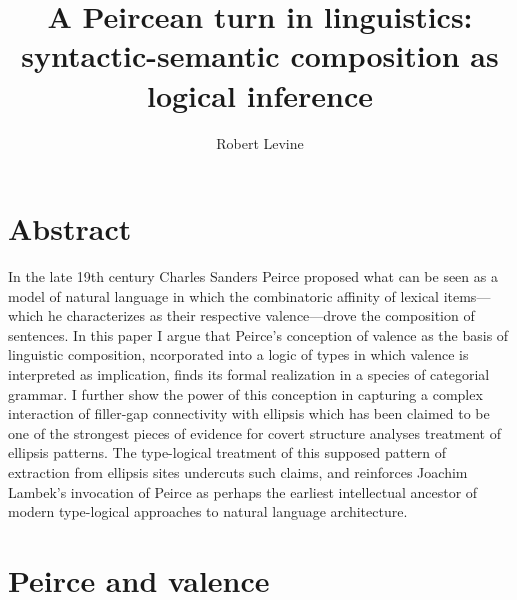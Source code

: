 \documentclass[output=paper,colorlinks,citecolor=brown]{langscibook}
\title{A Peircean turn in linguistics: syntactic-semantic composition as logical inference}
\author{Robert Levine\affiliation{Ohio State University}}
\begin{document}
\maketitle

\section{Abstract}
In the late 19th century Charles Sanders Peirce proposed what can be seen as a model of natural language in which the combinatoric affinity of lexical items—which he characterizes as their respective valence—drove the composition of sentences. In this paper I argue that Peirce’s conception of valence as the basis of linguistic composition,  ncorporated into a logic of types in which valence is interpreted as implication, finds its formal realization in a species of categorial grammar. I further show the power of this conception in capturing a complex interaction of filler-gap connectivity with ellipsis which has been claimed to be one of the strongest pieces of evidence for covert structure analyses treatment of ellipsis patterns. The type-logical treatment of this supposed pattern of extraction from ellipsis sites undercuts such claims, and reinforces Joachim Lambek’s invocation of Peirce as perhaps the earliest intellectual ancestor of modern type-logical approaches to natural language architecture.

\section{Peirce and valence}
\end{document}
